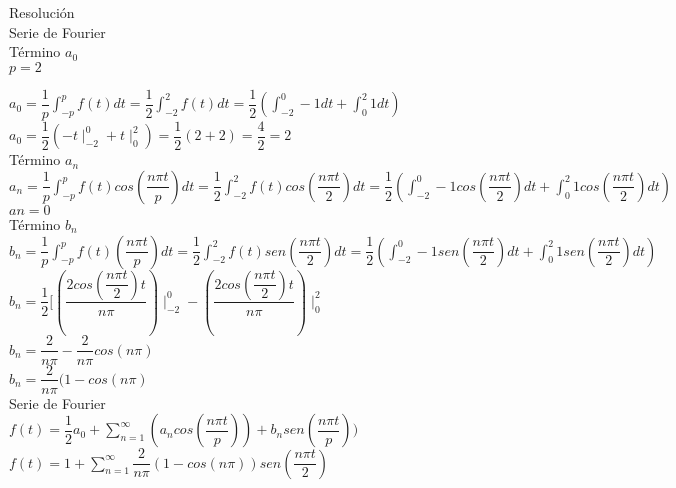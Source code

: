 \documentclass[10pt,a4paper]{article}
\begin{document}
\begin{center}
Resolución\\
Serie de Fourier\\
Término $a_0$\\
$p=2$
\end{center}

\begin{center}
$\displaystyle{a_0 = \dfrac{1}{p} \int_{-p}^{p} f(t) dt = \dfrac{1}{2} \int_{-2}^{2} f(t) dt = \dfrac{1}{2} (\int_{-2}^{0} -1 dt + \int_{0}^{2} 1 dt)}$\\
$\displaystyle{a_0 = \dfrac{1}{2} (-t \mid^0_{-2}  +t \mid^2_0 ) = \dfrac{1}{2} (2+2)  = \dfrac{4}{2}}=2$\\
Término $a_n$\\
$\displaystyle{a_n = \dfrac{1}{p} \int_{-p}^{p} f(t) cos (\dfrac{n\pi t}{p})dt = \dfrac{1}{2} \int_{-2}^{2} f(t) cos (\dfrac{n\pi t}{2})dt = \dfrac{1}{2} (\int_{-2}^{0} -1 cos (\dfrac{n\pi t}{2})dt + \int_{0}^{2} 1 cos (\dfrac{n\pi t}{2})dt)}$\\


$\displaystyle {an = 0}$\\



Término $b_n$\\

$\displaystyle{b_n = \dfrac{1}{p} \int_{-p}^{p} f(t) (\dfrac{n\pi t}{p})dt = \dfrac{1}{2} \int_{-2}^{2} f(t) sen (\dfrac{n\pi t}{2})dt = \dfrac{1}{2} (\int_{-2}^{0} -1 sen (\dfrac{n\pi t}{2})dt + \int_{0}^{2} 1 sen (\dfrac{n\pi t}{2})dt)}$\\
$\displaystyle{b_n = \dfrac{1}{2} [(\dfrac{2cos(\dfrac{n\pi t}{2}) t}{n \pi}) \mid_{-2}^{0} - (\dfrac{2cos(\dfrac{n\pi t}{2}) t}{n \pi})  \mid_{0}^{2} }$\\
$\displaystyle{b_n = \dfrac{2}{n \pi} -\dfrac{2}{n \pi} cos(n \pi)}$\\

$\displaystyle{b_n = \dfrac{2}{n \pi}(1-cos(n \pi)}$\\
Serie de Fourier \\
$\displaystyle{f(t) = \dfrac{1}{2} a_0 + \sum_{n = 1}^{\infty} (a_n cos (\dfrac{n\pi t}{p})) + b_n sen (\dfrac{n\pi t}{p}))}$\\
$\displaystyle{f(t) = 1 +  \sum_{n = 1}^{\infty}\dfrac{2}{n \pi}(1-cos(n \pi))sen (\dfrac{n\pi t}{2})}$\\
\end{center}
\end{document}
